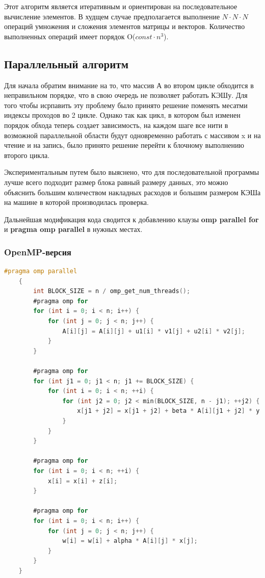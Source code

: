 \documentclass{article}
\begin{document}
{\normalsize Этот алгоритм является итеративным и ориентирован на последовательное вычисление элементов. В худщем случае предполагается выполнение $N\cdot N\cdot N$ операций умножения и сложения элементов матрицы и векторов. Количество выполненных операций имеет порядок O($const\cdot n^3$)}.

\subsection {Параллельный алгоритм}

Для начала обратим внимание на то, что массив А во втором цикле
обходится в неправильном порядке, что в свою очередь не позволяет работать КЭШу. Для того чтобы исрпавить эту проблему было принято решение поменять месатми индексы проходов во 2 цикле. Однако так как цикл, в котором был изменен порядок обхода теперь создает зависимость, на каждом шаге все нити в возможной параллельной области будут одновременно работать с массивом x и на чтение и на запись, было принято решение перейти к блочному выполнению второго цикла.

\vspace{0.5cm}
Экспериментальным путем было выяснено, что для последовательной
программы лучше всего подходит размер блока равный размеру данных, это можно
объяснить большим количеством накладных расходов и большим размером КЭШа на
машине в которой производилась проверка.

\vspace{0.5cm}
Дальнейшая модификация кода сводится к добавлению клаузы \textbf{omp parallel for} и \textbf{pragma omp parallel} в нужных местах.

\subsubsection {OpenMP-версия} 
\vspace{0.5cm}

\begin{lstlisting}[language = C]
    #pragma omp parallel
    {
        int BLOCK_SIZE = n / omp_get_num_threads();
        #pragma omp for
        for (int i = 0; i < n; i++) {
            for (int j = 0; j < n; j++) {
                A[i][j] = A[i][j] + u1[i] * v1[j] + u2[i] * v2[j];
            }
        }

        #pragma omp for
        for (int j1 = 0; j1 < n; j1 += BLOCK_SIZE) {
            for (int i = 0; i < n; ++i) {
                for (int j2 = 0; j2 < min(BLOCK_SIZE, n - j1); ++j2) {
                    x[j1 + j2] = x[j1 + j2] + beta * A[i][j1 + j2] * y[i];
                }
            }
        }

        #pragma omp for
        for (int i = 0; i < n; ++i) {
            x[i] = x[i] + z[i];
        }

        #pragma omp for
        for (int i = 0; i < n; i++) {
            for (int j = 0; j < n; j++) {
                w[i] = w[i] + alpha * A[i][j] * x[j];
            }
        }
    }
\end{lstlisting}
\vspace{0.5cm}
\end{document}
